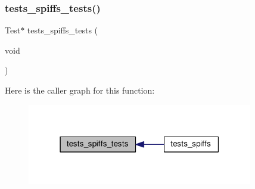 \subsubsection{\texorpdfstring{tests\+\_\+spiffs\+\_\+tests()}{tests\_spiffs\_tests()}}
{\footnotesize\ttfamily Test$\ast$ tests\+\_\+spiffs\+\_\+tests (\begin{DoxyParamCaption}\item[{void}]{ }\end{DoxyParamCaption})}

Here is the caller graph for this function\+:
\nopagebreak
\begin{figure}[H]
\begin{center}
\leavevmode
\includegraphics[width=279pt]{tests-spiffs_8c_ad92b2e5bdf15c38211974ac8676cf01f_icgraph}
\end{center}
\end{figure}
